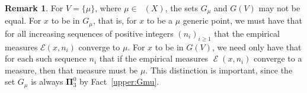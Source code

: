 \documentclass{amsart}
\theoremstyle{definition}
\newtheorem{rem}[thm]{Remark}
\newcommand{\cE}{\mathcal{E}}
\newcommand{\bs}{\boldsymbol{\Sigma}}
\newcommand{\bp}{\boldsymbol{\Pi}}
\DeclareMathOperator{\Emp}{\mathcal{E}}%
\DeclareMathOperator{\MT}{\mathcal{M}_{\mathit T} }
\begin{document}
\begin{rem} \label{nts}
For $V=\{\mu\}$, where $\mu \in \MT(X)$, the sets $G_\mu$ and $G(V)$ may not be equal. For
$x$ to be in $G_\mu$, that is, for $x$ to be a $\mu$ generic point, we must have that
for all increasing sequences of positive integers $(n_i)_{i\ge 1}$ that the empirical measures $\cE(x,n_i)$ converge to
$\mu$. For $x$ to be in $G(V)$, we need only have that for each such sequence $n_i$
that if the empirical measures $\Emp(x,n_i)$ converge to a measure, then that measure must be $\mu$.
This distinction is important, since the set $G_\mu$ is always $\bp^0_3$ by Fact~\ref{upper:Gmu}.
\end{rem}
\end{document}
